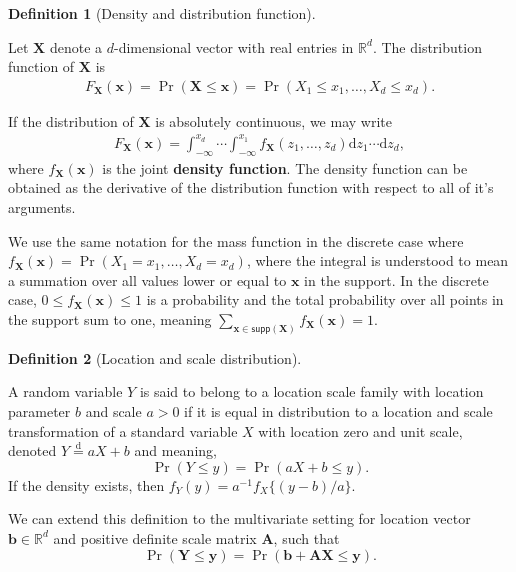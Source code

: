\documentclass[
  11pt,
  letterpaper,
]{scrbook}
\theoremstyle{definition}
\theoremstyle{definition}
\theoremstyle{definition}
\newtheorem{definition}{Definition}[chapter]
\theoremstyle{plain}
\theoremstyle{plain}
\theoremstyle{remark}
\begin{document}
\begin{definition}[Density and distribution
function]\protect\hypertarget{def-cdf}{}\label{def-cdf}

Let \(\boldsymbol{X}\) denote a \(d\)-dimensional vector with real
entries in \(\mathbb{R}^d\). The distribution function of
\(\boldsymbol{X}\) is \begin{align*}
 F_{\boldsymbol{X}}(\boldsymbol{x}) = \Pr(\boldsymbol{X} \leq \boldsymbol{x}) = \Pr(X_1 \leq x_1, \ldots, X_d \leq x_d).
\end{align*}

If the distribution of \(\boldsymbol{X}\) is absolutely continuous, we
may write \begin{align*}
 F_{\boldsymbol{X}}(\boldsymbol{x}) = \int_{-\infty}^{x_d} \cdots \int_{-\infty}^{x_1} f_{\boldsymbol{X}}(z_1, \ldots, z_d) \mathrm{d} z_1 \cdots \mathrm{d} z_d,
\end{align*} where \(f_{\boldsymbol{X}}(\boldsymbol{x})\) is the joint
\textbf{density function}. The density function can be obtained as the
derivative of the distribution function with respect to all of it's
arguments.

We use the same notation for the mass function in the discrete case
where
\(f_{\boldsymbol{X}}(\boldsymbol{x}) = \Pr(X_1 = x_1, \ldots, X_d = x_d)\),
where the integral is understood to mean a summation over all values
lower or equal to \(\boldsymbol{x}\) in the support. In the discrete
case, \(0 \leq f_{\boldsymbol{X}}(\boldsymbol{x}) \leq 1\) is a
probability and the total probability over all points in the support sum
to one, meaning
\(\sum_{\boldsymbol{x} \in \mathsf{supp}(\boldsymbol{X})} f_{\boldsymbol{X}}(\boldsymbol{x}) = 1.\)

\end{definition}

\begin{definition}[Location and scale
distribution]\protect\hypertarget{def-location-scale}{}\label{def-location-scale}

A random variable \(Y\) is said to belong to a location scale family
with location parameter \(b\) and scale \(a>0\) if it is equal in
distribution to a location and scale transformation of a standard
variable \(X\) with location zero and unit scale, denoted
\(Y \stackrel{\mathrm{d}}{=} aX + b\) and meaning,
\[\Pr(Y \leq y) = \Pr(aX + b \leq y).\] If the density exists, then
\(f_Y(y) = a^{-1}f_X\{(y-b)/a\}\).

We can extend this definition to the multivariate setting for location
vector \(\boldsymbol{b} \in \mathbb{R}^d\) and positive definite scale
matrix \(\mathbf{A}\), such that
\[\Pr(\boldsymbol{Y} \leq \boldsymbol{y}) = \Pr(\boldsymbol{b} + \mathbf{A}\boldsymbol{X} \leq \boldsymbol{y}).\]

\end{definition}
\end{document}
